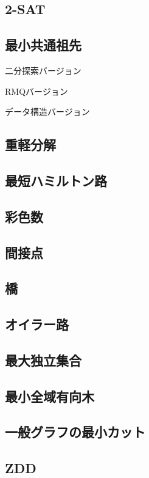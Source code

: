 \subsection{2-SAT}


\subsection{最小共通祖先}
二分探索バージョン

RMQバージョン

データ構造バージョン


\subsection{重軽分解}


\subsection{最短ハミルトン路}


\subsection{彩色数}


\subsection{間接点}


\subsection{橋}


\subsection{オイラー路}


\subsection{最大独立集合}


\subsection{最小全域有向木}


\subsection{一般グラフの最小カット}


\subsection{ZDD}

